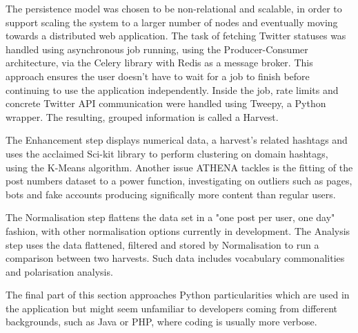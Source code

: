 The persistence model was chosen to be non-relational and scalable, in order to support scaling the system to a larger number of nodes and eventually moving towards a distributed web application. The task of fetching Twitter statuses was handled using asynchronous job running, using the Producer-Consumer architecture, via the Celery library with Redis as a message broker. This approach ensures the user doesn't have to wait for a job to finish before continuing to use the application independently. Inside the job, rate limits and concrete Twitter API communication were handled using Tweepy, a Python wrapper. The resulting, grouped information is called a Harvest.

The Enhancement step displays numerical data, a harvest's related hashtags and uses the acclaimed Sci-kit library to perform clustering on domain hashtags, using the K-Means algorithm. Another issue ATHENA tackles is the fitting of the post numbers dataset to a power function, investigating on outliers such as pages, bots and fake accounts producing significally more content than regular users.

The Normalisation step flattens the data set in a "one post per user, one day" fashion, with other normalisation options currently in development. The Analysis step uses the data flattened, filtered and stored by Normalisation to run a comparison between two harvests. Such data includes vocabulary commonalities and polarisation analysis.

The final part of this section approaches Python particularities which are used in the application but might seem unfamiliar to developers coming from different backgrounds, such as Java or PHP, where coding is usually more verbose.